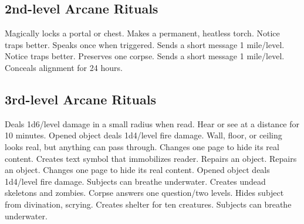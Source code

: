 \subsection{2nd-level Arcane Rituals}
\begin{rituallist}
   Magically locks a portal or chest.
   Makes a permanent, heatless torch.
   Notice traps better.
   Speaks once when triggered.
   Sends a short message 1 mile/level.
   Notice traps better.
   Preserves one corpse.
   Sends a short message 1 mile/level.
   Conceals alignment for 24 hours.
\end{rituallist}

\subsection{3rd-level Arcane Rituals}
\begin{rituallist}
   Deals 1d6/level damage in a small radius when read.
   Hear or see at a distance for 10 minutes.
   Opened object deals 1d4/level fire damage.
   Wall, floor, or ceiling looks real, but anything can pass through.
   Changes one page to hide its real content.
   Creates text symbol that immobilizes reader.
   Repairs an object.
   Repairs an object.
   Changes one page to hide its real content.
   Opened object deals 1d4/level fire damage.
   Subjects can breathe underwater.
   Creates undead skeletons and zombies.
   Corpse answers one question/two levels.
   Hides subject from divination, scrying.
   Creates shelter for ten creatures.
   Subjects can breathe underwater.
\end{rituallist}

